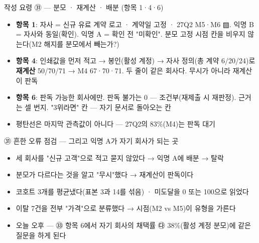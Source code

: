 \begin{frame}{작성 요령 ㉛ — 분모 · 재계산 · 배분 (항목 1·4·6)}
\begin{itemize}
\item \textbf{항목 1}: 자사 = 신규 유료 계약 로고 · 계약일 고정 · 27Q2 M5·M6 ▨. 익명 B = 자사와 동일(확인). 익명 A = 확인 전 "미확인". 분모 고정 시점 칸을 비우지 않는다(M2 해지를 분모에서 빼는가?)
\item \textbf{항목 4}: 인쇄값을 먼저 적고 → 봉인(활성 계정) → 자사 정의(총 계약 6/20/24)로 \textbf{재계산} 50/70/71 → M4 67·70·71. 두 줄이 같은 회사다. 무시가 아니라 재계산이 판독
\item \textbf{항목 6}: 판독 가능한 회사에만. 판독 불가는 0 — 조건부(재제출 시 재판정). 근거는 셀 번지. "3위라면" 칸 — 자기 문서로 돌아오는 칸
\item 평탄선은 마지막 관측값이 아니다 — 27Q2의 83\%(M4)는 판독 대기
\end{itemize}
\end{frame}

\begin{frame}{㉛ 흔한 오류 점검 — 그리고 익명 A가 자기 회사가 되는 곳}
\begin{itemize}
\item 세 회사를 "신규 고객"으로 적고 묻지 않았다 → 익명 A에 배분 → 탈락
\item 분모가 다르다는 것을 알고 "무시"했다 → 재계산이 판독이다
\item 코호트 3개를 평균냈다(표본 3과 14를 섞음) · 미도달을 0 또는 100으로 읽었다
\item 이탈 7건을 전부 "가격"으로 분류했다 → 시점(M2 vs M5)이 유형을 가른다
\item 오늘 오후 — ㉝ 항목 6에서 자기 회사의 채택률 ㉰ 38\%(활성 계정 분모)에 같은 질문을 하게 된다
\end{itemize}
\end{frame}

